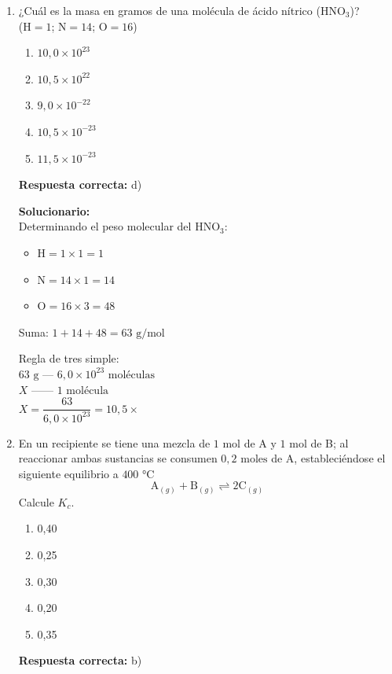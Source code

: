 \begin{enumerate}
	
	\item ¿Cuál es la masa en gramos de una molécula de ácido nítrico ($\text{HNO}_3$)?\\
	($\text{H}=1$; $\text{N}=14$; $\text{O}=16$)
	\begin{enumerate}[label=\alph*)]
		\item $10,0 \times 10^{23}$
		\item $10,5 \times 10^{22}$
		\item $9,0 \times 10^{-22}$
		\item $10,5 \times 10^{-23}$
		\item $11,5 \times 10^{-23}$
	\end{enumerate}
	\textbf{Respuesta correcta:} d)
	
	\vspace{2mm}
	\textbf{Solucionario:}\\
	Determinando el peso molecular del $\text{HNO}_3$:
	\begin{itemize}
		\item $\text{H} = 1 \times 1 = 1$
		\item $\text{N} = 14 \times 1 = 14$
		\item $\text{O} = 16 \times 3 = 48$
	\end{itemize}
	Suma: $1 + 14 + 48 = 63\text{ g/mol}$
	
	Regla de tres simple:\\
	
	$63\text{ g} \text{ --- } 6,0 \times 10^{23} \text{ moléculas} $\\
	
	$ X \text{ ------ } 1 \text{ molécula} $\\
	
	$X = \dfrac{63}{6,0 \times 10^{23}} = 10,5 \times $  
	
	\vspace{6mm}
	
	\item En un recipiente se tiene una mezcla de $1\text{ mol}$ de A y $1\text{ mol}$ de B; al reaccionar ambas sustancias se consumen $0,2\text{ moles}$ de A, estableciéndose el siguiente equilibrio a $400\text{ °C}$
	\[ \text{A}_{(g)} + \text{B}_{(g)} \rightleftharpoons 2\text{C}_{(g)} \]
	Calcule $K_c$.
	\begin{enumerate}[label=\alph*)]
		\item 0,40
		\item 0,25
		\item 0,30
		\item 0,20
		\item 0,35
	\end{enumerate}
	\textbf{Respuesta correcta:} b)
	

\end{enumerate}
